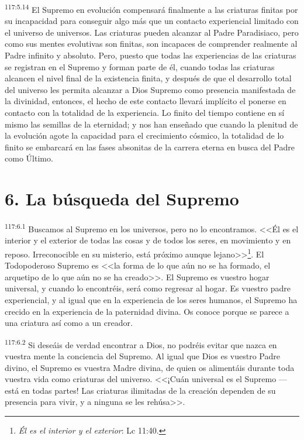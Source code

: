 \par
\textsuperscript{117:5.14} El Supremo en evolución compensará finalmente a las criaturas finitas por su incapacidad para conseguir algo más que un contacto experiencial limitado con el universo de universos. Las criaturas pueden alcanzar al Padre Paradisiaco, pero como sus mentes evolutivas son finitas, son incapaces de comprender realmente al Padre infinito y absoluto. Pero, puesto que todas las experiencias de las criaturas se registran en el Supremo y forman parte de él, cuando todas las criaturas alcancen el nivel final de la existencia finita, y después de que el desarrollo total del universo les permita alcanzar a Dios Supremo como presencia manifestada de la divinidad, entonces, el hecho de este contacto llevará implícito el ponerse en contacto con la totalidad de la experiencia. Lo finito del tiempo contiene en sí mismo las semillas de la eternidad; y nos han enseñado que cuando la plenitud de la evolución agote la capacidad para el crecimiento cósmico, la totalidad de lo finito se embarcará en las fases absonitas de la carrera eterna en busca del Padre como Último.

\section*{6. La búsqueda del Supremo}
\par
\textsuperscript{117:6.1} Buscamos al Supremo en los universos, pero no lo encontramos. <<Él es el interior y el exterior de todas las cosas y de todos los seres, en movimiento y en reposo. Irreconocible en su misterio, está próximo aunque lejano>>\footnote{\textit{Él es el interior y el exterior}: Lc 11:40.}. El Todopoderoso Supremo es <<la forma de lo que aún no se ha formado, el arquetipo de lo que aún no se ha creado>>. El Supremo es vuestro hogar universal, y cuando lo encontréis, será como regresar al hogar. Es vuestro padre experiencial, y al igual que en la experiencia de los seres humanos, el Supremo ha crecido en la experiencia de la paternidad divina. Os conoce porque se parece a una criatura así como a un creador.

\par
\textsuperscript{117:6.2} Si deseáis de verdad encontrar a Dios, no podréis evitar que nazca en vuestra mente la conciencia del Supremo. Al igual que Dios es vuestro Padre divino, el Supremo es vuestra Madre divina, de quien os alimentáis durante toda vuestra vida como criaturas del universo. <<¡Cuán universal es el Supremo ---está en todas partes! Las criaturas ilimitadas de la creación dependen de su presencia para vivir, y a ninguna se les rehúsa>>.

